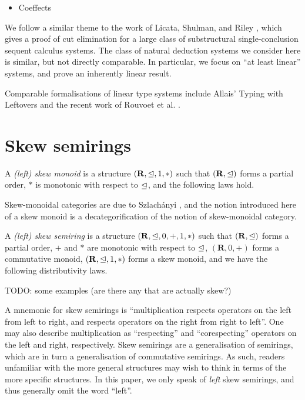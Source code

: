 \documentclass[submission,copyright,creativecommons]{eptcs}
\begin{document}
\begin{itemize}
  \item Coeffects \cite{BrunelGMZ14,GhicaS14,reed10distance,PetricekOM14}
\end{itemize}

We follow a similar theme to the work of Licata, Shulman, and Riley
\cite{LicataSR17}, which gives a proof of cut elimination for a large class of
substructural single-conclusion sequent calculus systems.
The class of natural deduction systems we consider here is similar, but not
directly comparable.
In particular, we focus on ``at least linear'' systems, and prove an inherently
linear result.

Comparable formalisations of linear type systems include Allais' Typing with
Leftovers \cite{allais:LIPIcs:2018:10049} and the recent work of Rouvoet et al.
\cite{RPKV20}.

\section{Skew semirings}\label{sec:algebra}

A \emph{(left) skew monoid} is a structure $(\mathbf R, \trianglelefteq, 1, *)$ such
that $(\mathbf R, \trianglelefteq)$ forms a partial order, $*$ is monotonic with
respect to $\trianglelefteq$, and the following laws hold.

Skew-monoidal categories are due to Szlach\'anyi \cite{skew}, and the notion
introduced here of a skew monoid is a decategorification of the notion of
skew-monoidal category.

A \emph{(left) skew semiring} is a structure $(\mathbf R, \trianglelefteq, 0, +, 1, *)$
such that $(\mathbf R, \trianglelefteq)$ forms a partial order, $+$ and $*$ are
monotonic with respect to $\trianglelefteq$, $(\mathbf R, 0, +)$ forms a commutative
monoid, $(\mathbf R, \trianglelefteq, 1, *)$ forms a skew monoid, and we have the
following distributivity laws.

\begin{example}
  TODO: some examples (are there any that are actually skew?)
\end{example}

A mnemonic for skew semirings is ``multiplication respects operators on the left
from left to right, and respects operators on the right from right to left''.
One may also describe multiplication as ``respecting'' and ``corespecting''
operators on the left and right, respectively.
Skew semirings are a generalisation of semirings, which are in turn a
generalisation of commutative semirings.
As such, readers unfamiliar with the more general structures may wish to think
in terms of the more specific structures.
In this paper, we only speak of \emph{left} skew semirings, and thus generally
omit the word ``left''.
\end{document}
